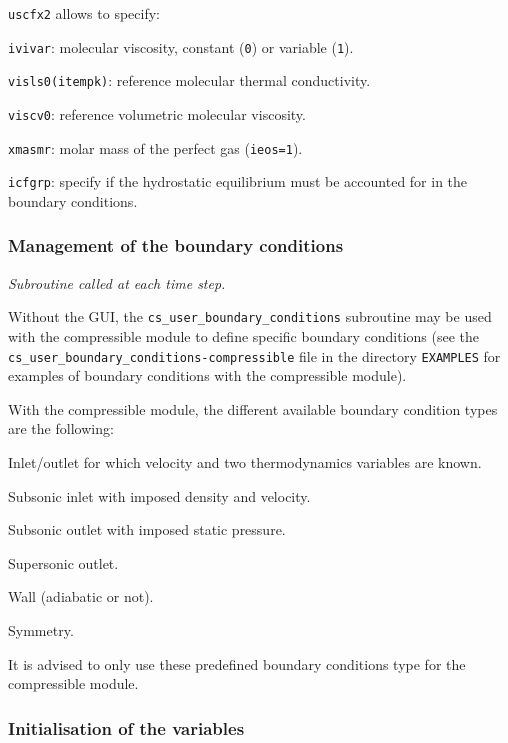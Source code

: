 {{\texttt{uscfx2} allows to specify:
\begin{list}{-}{}
  \item \texttt{ivivar}: molecular viscosity, constant (\texttt{0}) or variable (\texttt{1}).
  \item \texttt{visls0(itempk)}: reference molecular thermal conductivity.
  \item \texttt{viscv0}: reference volumetric molecular viscosity.
  \item \texttt{xmasmr}: molar mass of the perfect gas (\texttt{ieos=1}).
  \item \texttt{icfgrp}: specify if the hydrostatic equilibrium must be accounted for in the
                         boundary conditions.
\end{list}

\subsubsection{Management of the boundary conditions}

\noindent
\textit{Subroutine called at each time step.}

Without the GUI, the \texttt{cs\_user\_boundary\_conditions} subroutine may be used with
the compressible module to define specific boundary conditions
(see the \texttt{cs\_user\_boundary\_conditions-compressible} file in the directory \texttt{EXAMPLES} 
for examples of boundary conditions with the compressible module).

With the compressible module, the different available boundary condition types
are the following:

\begin{list}{-}{}
  \item Inlet/outlet for which velocity and two thermodynamics variables are known.
  \item Subsonic inlet with imposed density and velocity.
  \item Subsonic outlet with imposed static pressure.
  \item Supersonic outlet.
  \item Wall (adiabatic or not).
  \item Symmetry.
\end{list}

It is advised to only use these predefined boundary conditions type for the compressible module.

\subsubsection{Initialisation of the variables}

}}
